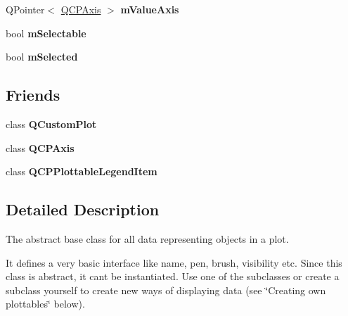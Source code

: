 \begin{DoxyCompactItemize}
\item 
\hypertarget{classQCPAbstractPlottable_a2901452ca4aea911a1827717934a4bda}{}Q\+Pointer$<$ \hyperlink{classQCPAxis}{Q\+C\+P\+Axis} $>$ {\bfseries m\+Value\+Axis}\label{classQCPAbstractPlottable_a2901452ca4aea911a1827717934a4bda}

\item 
\hypertarget{classQCPAbstractPlottable_aceee52342c8e75727abcbd164986fdcb}{}bool {\bfseries m\+Selectable}\label{classQCPAbstractPlottable_aceee52342c8e75727abcbd164986fdcb}

\item 
\hypertarget{classQCPAbstractPlottable_a43f68a0603e9bcd016bdfa6d9d5c41c9}{}bool {\bfseries m\+Selected}\label{classQCPAbstractPlottable_a43f68a0603e9bcd016bdfa6d9d5c41c9}

\end{DoxyCompactItemize}
\subsection*{Friends}
\begin{DoxyCompactItemize}
\item 
\hypertarget{classQCPAbstractPlottable_a1cdf9df76adcfae45261690aa0ca2198}{}class {\bfseries Q\+Custom\+Plot}\label{classQCPAbstractPlottable_a1cdf9df76adcfae45261690aa0ca2198}

\item 
\hypertarget{classQCPAbstractPlottable_af123edeca169ec7a31958a1d714e1a8a}{}class {\bfseries Q\+C\+P\+Axis}\label{classQCPAbstractPlottable_af123edeca169ec7a31958a1d714e1a8a}

\item 
\hypertarget{classQCPAbstractPlottable_a104c78e91302afd6842a903e472f552f}{}class {\bfseries Q\+C\+P\+Plottable\+Legend\+Item}\label{classQCPAbstractPlottable_a104c78e91302afd6842a903e472f552f}

\end{DoxyCompactItemize}


\subsection{Detailed Description}
The abstract base class for all data representing objects in a plot. 

It defines a very basic interface like name, pen, brush, visibility etc. Since this class is abstract, it can\textquotesingle{}t be instantiated. Use one of the subclasses or create a subclass yourself to create new ways of displaying data (see \char`\"{}\+Creating own plottables\char`\"{} below).

